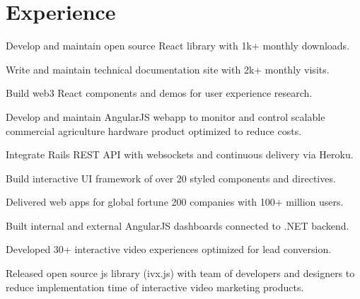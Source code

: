 \documentclass[]{deedy-resume-openfont}
\begin{document}
\begin{minipage}[t]{0.66\textwidth}


\section{Experience}

\vspace{\topsep} %
\begin{tightemize}
\item Develop and maintain open source React library with 1k+ monthly downloads. \item Write and maintain technical documentation site with 2k+ monthly visits. \item Build web3 React components and demos for user experience research. \end{tightemize}
\sectionsep


\begin{tightemize}
\item Develop and maintain AngularJS webapp to monitor and control scalable commercial agriculture hardware product optimized to reduce costs. \item Integrate Rails REST API with websockets and continuous delivery via Heroku. \item Build interactive UI framework of over 20 styled components and directives. \end{tightemize}
\sectionsep

\begin{tightemize}
\item Delivered web apps for global fortune 200 companies with 100+ million users.\item Built internal and external AngularJS dashboards connected to .NET backend.\item Developed 30+ interactive video experiences optimized for lead conversion.\item Released open source js library (ivx.js) with team of developers and designers to reduce implementation time of interactive video marketing products.\end{tightemize}
\sectionsep


\end{minipage}
\end{document}
